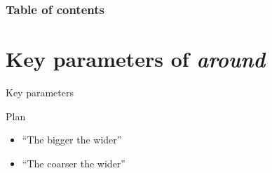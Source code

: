 \documentclass[xcolor=table, hyperref={pdfpagelabels=false}]{beamer}
\begin{document}

\begin{frame}
\frametitle{Table of contents}
\tableofcontents
\end{frame} 
\section{Key parameters of \textit{around}}
\begin{frame}{}
\begin{center}
	\Huge Key parameters
	\normalsize
	\begin{block}{Plan}
		\begin{itemize}
			\item ``The bigger the wider''
			\item ``The coarser the wider''
		\end{itemize}
	\end{block}
\end{center}
\end{frame}
\end{document}
